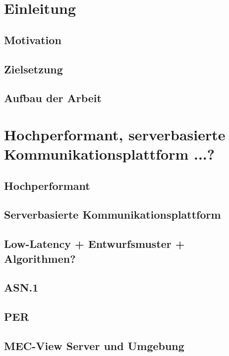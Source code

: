 \documentclass[
	12pt,
	table,
	bigheadings,
	ngerman,
	a4paper,
	BCOR5mm,
	DIV14,
	1.1headlines,
	pagesize,
	oneside,
	openright,
	titlepage,
	headsepline,
	nochapterprefix,
	bibtotoc,
	tocindent,
	listsindent,
	pointlessnumbers,
	cleardoubleempty,
	fleqn,
	halfparskip
]{scrbook}
\date{\gitAuthorDate}
\begin{document}
	
	
	
	
	\thispagestyle{empty}
	
	\setcounter{page}{0}
	
	\clearpage	
	\hypersetup{allcolors=black}
	\tableofcontents
	\hypersetup{allcolors=blue}
	\newpage
	
	
	\setcounter{page}{1}
	\chapter{Einleitung}
	\section{Motivation}
	\section{Zielsetzung}
	\section{Aufbau der Arbeit}
	
	

	
	\chapter{Hochperformant, serverbasierte Kommunikationsplattform ...?}
		\section{Hochperformant}
		\section{Serverbasierte Kommunikationsplattform}
		\section{Low-Latency + Entwurfsmuster + Algorithmen?}
		\section{ASN.1}
		\section{PER}
		\section{MEC-View Server und Umgebung}
		
\end{document}
